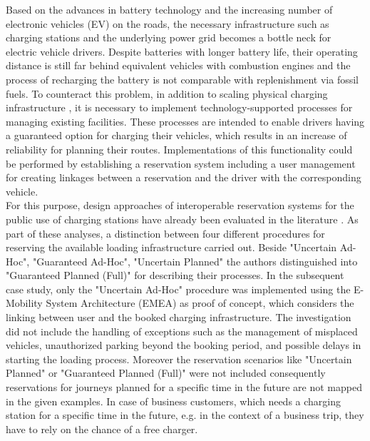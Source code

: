 

\Abstract
\noindent Based on the advances in battery technology and the increasing number of electronic vehicles (EV) on the roads, the necessary infrastructure such as charging stations and the underlying power grid becomes a bottle neck for electric vehicle drivers. Despite batteries with longer battery life, their operating distance is still far behind equivalent vehicles with combustion engines and the process of recharging the battery is not comparable with replenishment \cite{orcioni_electric_2018} via fossil fuels. To counteract this problem, in addition to scaling physical charging infrastructure \cite[p.~165231]{adib_e-mobility_2019}, it is necessary to implement technology-supported processes for managing existing facilities.
\noindent These processes are intended to enable drivers having a guaranteed option for charging their vehicles, which results in an increase of reliability for planning their routes. Implementations of this functionality could be performed by establishing a reservation system including a user management for creating linkages between a reservation and the driver with the corresponding vehicle.\\
\noindent For this purpose, design approaches of interoperable reservation systems for the public use of charging stations have already been evaluated in the literature \cite{basmadjian_interoperable_2019,adib_e-mobility_2019}. As part of these analyses, a distinction between four different procedures for reserving the available loading infrastructure carried out. Beside "Uncertain Ad-Hoc", "Guaranteed Ad-Hoc", "Uncertain Planned" the authors distinguished into "Guaranteed Planned (Full)" \cite{basmadjian_reference_2020} for describing their processes. In the subsequent case study, only the "Uncertain Ad-Hoc" procedure was implemented using the E-Mobility System Architecture (EMEA) \cite{kirpes_e-mobility_2019} as proof of concept, which considers the linking between user and the booked charging infrastructure. 
The investigation did not include the handling of exceptions such as the management of misplaced vehicles, unauthorized parking beyond the booking period, and possible delays in starting the loading process. Moreover the reservation scenarios like "Uncertain Planned" or "Guaranteed Planned (Full)" were not included consequently reservations for journeys planned for a specific time in the future are not mapped in the given examples. In case of business customers, which needs a charging station for a  specific time in the future, e.g. in the context of a business trip, they have to rely on the chance of a free charger.\\
